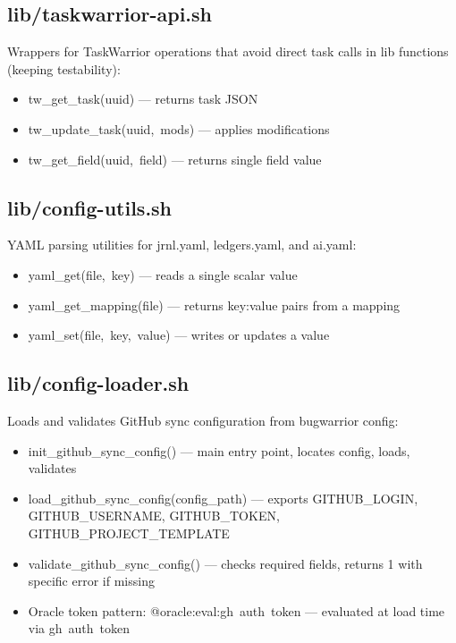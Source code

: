 \documentclass[11pt, a4paper, DIV=14]{scrartcl}
\renewcommand{\texttt}[1]{{\ttfamily\fontsize{8.5}{10.5}\selectfont\color{BabbNavy}#1}}
\providecommand{\tightlist}{\setlength{\itemsep}{2pt}\setlength{\parskip}{0pt}}
\begin{document}
\subsection{lib/taskwarrior-api.sh}\label{libtaskwarrior-api.sh}

Wrappers for TaskWarrior operations that avoid direct \texttt{task}
calls in lib functions (keeping testability):

\begin{itemize}
\tightlist
\item
  \texttt{tw\_get\_task(uuid)} --- returns task JSON
\item
  \texttt{tw\_update\_task(uuid,\ mods)} --- applies modifications
\item
  \texttt{tw\_get\_field(uuid,\ field)} --- returns single field value
\end{itemize}

\subsection{lib/config-utils.sh}\label{libconfig-utils.sh}

YAML parsing utilities for jrnl.yaml, ledgers.yaml, and ai.yaml:

\begin{itemize}
\tightlist
\item
  \texttt{yaml\_get(file,\ key)} --- reads a single scalar value
\item
  \texttt{yaml\_get\_mapping(file)} --- returns key:value pairs from a
  mapping
\item
  \texttt{yaml\_set(file,\ key,\ value)} --- writes or updates a value
\end{itemize}

\subsection{lib/config-loader.sh}\label{libconfig-loader.sh}

Loads and validates GitHub sync configuration from bugwarrior config:

\begin{itemize}
\tightlist
\item
  \texttt{init\_github\_sync\_config()} --- main entry point, locates
  config, loads, validates
\item
  \texttt{load\_github\_sync\_config(config\_path)} --- exports
  \texttt{GITHUB\_LOGIN}, \texttt{GITHUB\_USERNAME},
  \texttt{GITHUB\_TOKEN}, \texttt{GITHUB\_PROJECT\_TEMPLATE}
\item
  \texttt{validate\_github\_sync\_config()} --- checks required fields,
  returns 1 with specific error if missing
\item
  Oracle token pattern: \texttt{@oracle:eval:gh\ auth\ token} ---
  evaluated at load time via \texttt{gh\ auth\ token}
\end{itemize}
\end{document}

